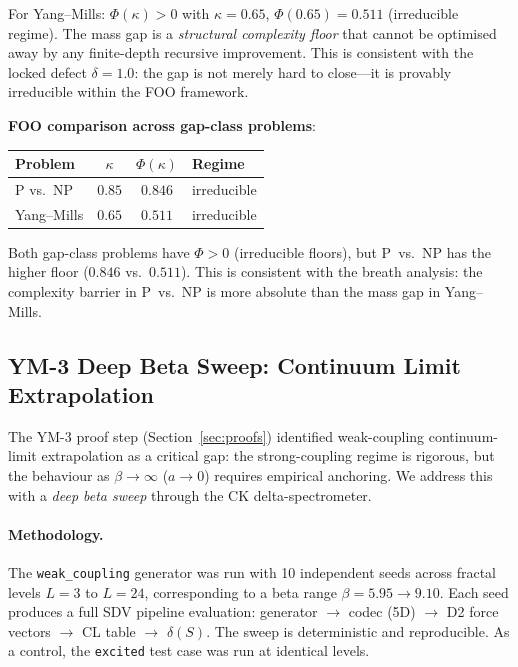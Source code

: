 \documentclass[11pt]{article}
\begin{document}
For Yang--Mills: $\Phi(\kappa) > 0$ with $\kappa = 0.65$,
$\Phi(0.65) = 0.511$ (irreducible regime).  The mass gap is a
\emph{structural complexity floor} that cannot be optimised away by
any finite-depth recursive improvement.  This is consistent with the
locked defect $\delta = 1.0$: the gap is not merely hard to close---it
is provably irreducible within the FOO framework.

\noindent
\textbf{FOO comparison across gap-class problems}:
\begin{center}
\begin{tabular}{|l|c|c|l|}
\hline
\textbf{Problem} & $\kappa$ & $\Phi(\kappa)$ & \textbf{Regime} \\
\hline
P vs.\ NP & $0.85$ & $0.846$ & irreducible \\
Yang--Mills & $0.65$ & $0.511$ & irreducible \\
\hline
\end{tabular}
\end{center}

\noindent
Both gap-class problems have $\Phi > 0$ (irreducible floors), but
P~vs.~NP has the higher floor ($0.846$ vs.~$0.511$).  This is
consistent with the breath analysis: the complexity barrier in
P~vs.~NP is more absolute than the mass gap in Yang--Mills.

\subsection{YM-3 Deep Beta Sweep: Continuum Limit Extrapolation}
\label{subsec:ym3-deep}

The YM-3 proof step (Section~\ref{sec:proofs}) identified weak-coupling
continuum-limit extrapolation as a critical gap: the strong-coupling
regime is rigorous, but the behaviour as $\beta \to \infty$
($a \to 0$) requires empirical anchoring.  We address this with a
\emph{deep beta sweep} through the CK delta-spectrometer.

\paragraph{Methodology.}
The \texttt{weak\_coupling} generator was run with 10 independent seeds
across fractal levels $L = 3$ to $L = 24$, corresponding to a beta
range $\beta = 5.95 \to 9.10$.  Each seed produces a full SDV pipeline
evaluation: generator $\to$ codec (5D) $\to$ D2 force vectors $\to$
CL table $\to$ $\delta(S)$.  The sweep is deterministic and
reproducible.  As a control, the \texttt{excited} test case was run at
identical levels.
\end{document}
